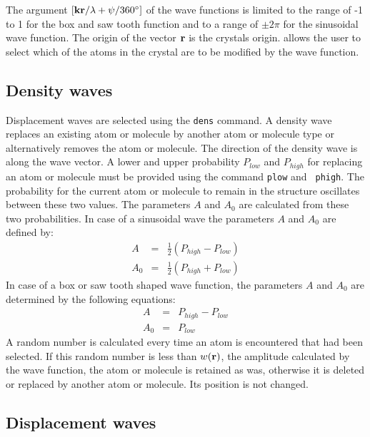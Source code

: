 %
The argument $[{\bf kr} / \lambda +\psi / 360^\circ]$ of the wave
functions is limited to the range of -1 to 1 for the box and saw
tooth function and to a range of $\pm 2 \pi$ for the sinusoidal wave
function.  The origin of the vector ${\bf r}$ is the crystals
origin.  \Discus allows the user to select which of the atoms
in the crystal are to be modified by the wave function.

\subsection*{Density waves \label{mod-wave-dens}}

Displacement waves are selected using the {\tt dens} command.  A
density wave replaces an existing atom or molecule by another atom
or molecule type or alternatively removes the atom or molecule. The
direction of the density wave is along the wave vector. A lower and
upper probability $P_{low}$ and $P_{high}$ for replacing an atom or
molecule must be provided using the command {\tt plow} and {\tt
phigh}. The probability for the current atom or molecule to remain
in the structure oscillates between these two values. The
parameters $A$ and $A_{0}$ are calculated from these two
probabilities. In case of a sinusoidal wave the parameters $A$ and
$A_{0}$ are defined by:
%
\begin{eqnarray}
    A     & = & \frac{1}{2} ( P_{high} - P_{low})
    \nonumber \\
    A_{0} & = & \frac{1}{2} ( P_{high} + P_{low})
    \label{wave-eq4}
\end{eqnarray}
%
In case of a box or saw tooth shaped wave function, the parameters
$A$ and $A_{0}$ are determined by the following equations:
%
\begin{eqnarray}
    A     & = & P_{high} - P_{low}
    \nonumber \\
    A_{0} & = & P_{low}
    \label{wave-eq4b}
\end{eqnarray}
%
A random number is calculated every time an atom is encountered
that had been selected.  If this random number is less than
$w({\bf r})$, the amplitude calculated by the wave function, the
atom or molecule is retained as was, otherwise it is deleted or
replaced by another atom or molecule. Its position is not changed.

\subsection*{Displacement waves \label{mod-wave-disp}}

